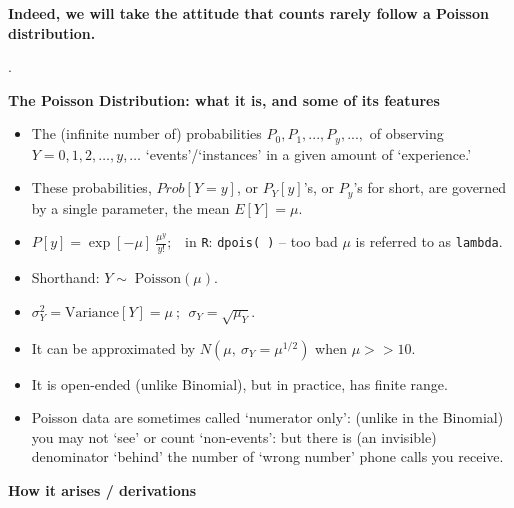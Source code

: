 \documentclass[]{book}
\begin{document}
\textbf{Indeed, we will take the attitude that counts rarely follow a Poisson distribution.}

.

\textbf{The Poisson Distribution: what it is, and some of its features}

\begin{itemize}
\item
  The (infinite number of) probabilities \(P_{0}, P_{1}, ..., P_{y}, ...,\) of observing \(Y = 0, 1, 2, \dots , y, \dots\) `events'/`instances' in a given amount of `experience.'
\item
  These probabilities, \(Prob[Y = y]\), or \(P_{Y}[y]\)'s, or \(P_{y}\)'s for short, are governed by a single parameter, the mean \(E[Y] = \mu.\)
\item
  \(P[y]= \exp[-\mu]\: \frac{\mu^{y}}{y!};\) ~in \texttt{R}: \texttt{dpois(\ )} -- too bad \(\mu\) is referred to as \texttt{lambda}.
\item
  Shorthand: \(Y\sim\; \textrm{Poisson}(\mu)\).
\item
  \(\sigma^2_Y = \textrm{Variance}[Y] = \mu \ ; \ \ \sigma_Y = \sqrt{\mu_{Y}}.\)
\item
  It can be approximated by \(N(\mu, \: \sigma_{Y} = \mu^{1/2})\) when \(\mu >> 10\).
\item
  It is open-ended (unlike Binomial), but in practice, has finite range.
\item
  Poisson data are sometimes called `numerator only': (unlike in the Binomial) you may not `see' or count `non-events': but there is (an invisible) denominator `behind' the number of `wrong number' phone calls you receive.
\end{itemize}

\textbf{How it arises / derivations}
\end{document}

